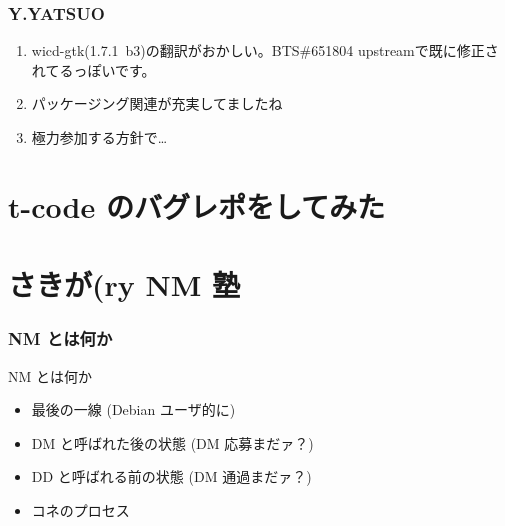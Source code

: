 \documentclass[cjk,dvipdfmx,10pt,%
hyperref={bookmarks=true,bookmarksnumbered=true,bookmarksopen=false,%
colorlinks=false,%
pdftitle={第 54 回 関西 Debian 勉強会},%
pdfauthor={倉敷・のがた・佐々木},%
pdfsubject={資料},%
}]{beamer}
\begin{document}
\begin{frame}[fragile]
\frametitle{ Y.YATSUO }
  \begin{enumerate}
  \item wicd-gtk(1.7.1~b3)の翻訳がおかしい。BTS\#651804 upstreamで既に修正されてるっぽいです。
  \item パッケージング関連が充実してましたね
  \item 極力参加する方針で…
  \end{enumerate}
\end{frame}


\section{t-code のバグレポをしてみた}


\section{さきが(ry NM 塾}








\begin{frame}[fragile]
\frametitle{NM とは何か}

\begin{block}{NM とは何か}
  \begin{itemize}
  \item 最後の一線 (Debian ユーザ的に)
  \item DM と呼ばれた後の状態 (DM 応募まだァ？)
  \item DD と呼ばれる前の状態 (DM 通過まだァ？)
  \item コネのプロセス
  \end{itemize}
\end{block}
\end{frame}
\end{document}
